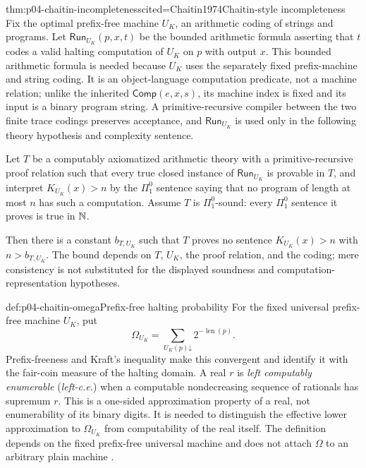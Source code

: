 \begin{hbtheorem}{thm:p04-chaitin-incompleteness}{cited=Chaitin1974}{Chaitin-style incompleteness}
Fix the optimal prefix-free machine \(U_K\), an arithmetic coding of strings and
programs.  Let \(\mathsf{Run}_{U_K}(p,x,t)\) be the bounded arithmetic
formula asserting that \(t\) codes a valid halting computation of \(U_K\) on
\(p\) with output \(x\).  This bounded arithmetic formula is needed because
\(U_K\) uses the separately fixed prefix-machine and string coding.  It is an
object-language computation predicate, not a machine relation; unlike the
inherited \(\mathsf{Comp}(e,x,s)\), its machine index is fixed and its input
is a binary program string.  A primitive-recursive compiler between the two
finite trace codings preserves acceptance, and
\(\mathsf{Run}_{U_K}\) is used only in the following theory hypothesis and
complexity sentence.

Let \(T\) be a computably axiomatized arithmetic
theory with a primitive-recursive proof relation such that every true closed
instance of \(\mathsf{Run}_{U_K}\) is provable in \(T\), and interpret
\(K_{U_K}(x)>n\) by the \(\Pi^0_1\) sentence saying that no program of length
at most \(n\) has such a computation.  Assume \(T\) is \(\Pi^0_1\)-sound:
every \(\Pi^0_1\) sentence it proves is true in \(\mathbb{N}\).

Then there is a constant \(b_{T,U_K}\) such that \(T\) proves no sentence
\(K_{U_K}(x)>n\) with \(n>b_{T,U_K}\).  The bound depends on \(T\), \(U_K\),
the proof relation, and the coding; mere consistency is not substituted for
the displayed soundness and computation-representation hypotheses.
\end{hbtheorem}

\begin{hbdefinition}{def:p04-chaitin-omega}{Prefix-free halting probability}
For the fixed universal prefix-free machine \(U_K\), put
\[
 \Omega_{U_K}=\sum_{U_K(p)\mathord\downarrow}2^{-\operatorname{len}(p)}.
\]
Prefix-freeness and Kraft's inequality make this convergent and identify it
with the fair-coin measure of the halting domain.  A real \(r\) is
\emph{left computably enumerable} (\emph{left-c.e.}) when a computable nondecreasing sequence of
rationals has supremum \(r\).  This is a one-sided approximation property of a
real, not enumerability of its binary digits.  It is needed to distinguish the
effective lower approximation to \(\Omega_{U_K}\) from computability of the
real itself.  The definition depends on the fixed prefix-free universal
machine and does not attach \(\Omega\) to an arbitrary plain machine
\cite{Chaitin1975,LiVitanyi2008}.
\end{hbdefinition}

